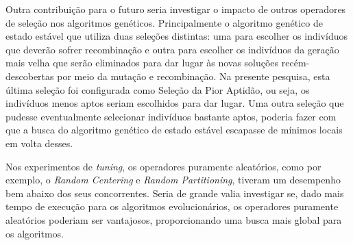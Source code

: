 Outra contribuição para o futuro seria investigar o impacto de outros operadores 
de seleção nos algoritmos genéticos. Principalmente o algoritmo genético de 
estado estável que utiliza duas seleções distintas: uma para escolher os 
indivíduos que deverão sofrer recombinação e outra para escolher os indivíduos 
da geração mais velha que serão eliminados para dar lugar às novas soluções 
recém-descobertas por meio da mutação e recombinação. Na presente pesquisa, 
esta última seleção foi configurada como Seleção da Pior Aptidão, ou seja, os 
indivíduos menos aptos seriam escolhidos para dar lugar. Uma outra seleção 
que pudesse eventualmente selecionar indivíduos bastante aptos, poderia fazer 
com que a busca do algoritmo genético de estado estável escapasse de mínimos 
locais em volta desses.

Nos experimentos de \textit{tuning}, os operadores puramente aleatórios, como 
por exemplo, o \textit{Random Centering} e \textit{Random Partitioning}, tiveram 
um desempenho bem abaixo dos seus concorrentes. Seria de grande valia investigar 
se, dado mais tempo de execução para os algoritmos evolucionários, os operadores 
puramente aleatórios poderiam ser vantajosos, proporcionando uma busca mais 
global para os algoritmos.